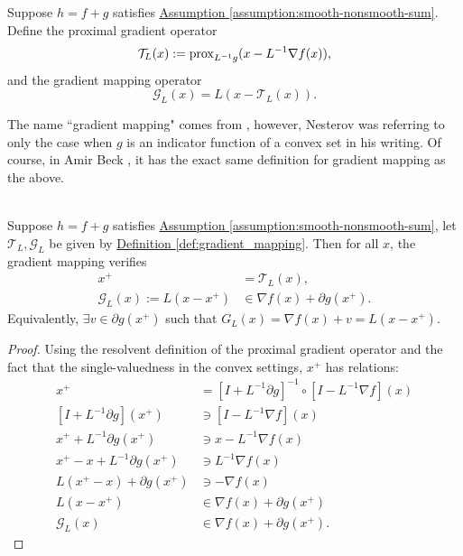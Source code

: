 \documentclass[12pt]{article}
\begin{document}
    \begin{definition}
        \label{def:gradient_mapping}
        Suppose $h = f + g$ satisfies 
        \hyperref[assumption:smooth-nonsmooth-sum]{Assumption \ref*{assumption:smooth-nonsmooth-sum}}. 
        Define the proximal gradient operator
        $$
            \mathcal T_L(x) := \operatorname{prox}_{L^{-1}g}(x - L^{-1}\nabla f(x)),
        $$
        and the gradient mapping operator
        $$
            \mathcal G_L(x) = L(x - \mathcal T_L(x)). 
        $$
    \end{definition}
    \begin{remark}
        The name ``gradient mapping" comes from \cite[(2.2.54)]{nesterov_lectures_2018}, however, Nesterov was referring to only the case when $g$ is an indicator function of a convex set in his writing. 
        Of course, in Amir Beck \cite[10.3.2]{beck_first-order_nodate}, it has the exact same definition for gradient mapping as the above. 
    \end{remark}

    \begin{lemma}
    \label{lemma:grad-map-approx-subgrad}\; \\
        Suppose $h = f + g$ satisfies 
        \hyperref[assumption:smooth-nonsmooth-sum]{Assumption \ref{assumption:smooth-nonsmooth-sum}}, 
        let $\mathcal T_L, \mathcal G_L$ be given by 
        \hyperref[def:gradient_mapping]{Definition \ref*{def:gradient_mapping}}.
        Then for all $x$, the gradient mapping verifies
        \begin{align*}
            x^+ &= \mathcal T_L(x), 
            \\
            \mathcal G_L(x) := L(x - x^+) &\in  \nabla f(x) + \partial g(x^+). 
        \end{align*}
        Equivalently, $\exists v \in \partial g(x^+)$ such that $G_L(x) = \nabla f(x) + v = L(x - x^+)$. 
    \end{lemma}
    \begin{proof}
        Using the resolvent definition of the proximal gradient operator and the fact that the single-valuedness in the convex settings, $x^+$ has relations: 
        \begin{align*}
            x^+ &= [I + L^{-1}\partial g]^{-1}\circ [I - L^{-1}\nabla f](x)
            \\
            [I + L^{-1}\partial g](x^+) &\ni [I - L^{-1}\nabla f](x)
            \\
            x^+ + L^{-1}\partial g(x^+) &\ni x - L^{-1}\nabla f(x)
            \\
            x^+ - x + L^{-1}\partial g(x^+) &\ni L^{-1}\nabla f(x)
            \\
            L(x^+ - x) + \partial g(x^+) &\ni - \nabla f(x)
            \\
            L(x - x^+) &\in \nabla f(x) + \partial g(x^+)
            \\
            \mathcal G_L(x) &\in \nabla f(x) + \partial g(x^+). 
        \end{align*}
    \end{proof}
\end{document}
